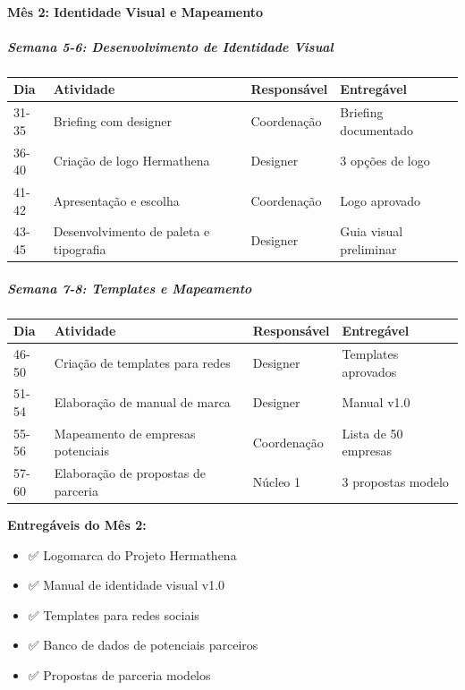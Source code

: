 \paragraph{Mês 2: Identidade Visual e Mapeamento}

\subparagraph{Semana 5-6: Desenvolvimento de Identidade Visual}

\bigskip\noindent
\begin{tabular}{p{}p{}p{}p{}}
\toprule
Dia & Atividade & Responsável & Entregável \\
\hline
31-35 & Briefing com designer & Coordenação & Briefing documentado \\
36-40 & Criação de logo Hermathena & Designer & 3 opções de logo \\
41-42 & Apresentação e escolha & Coordenação & Logo aprovado \\
43-45 & Desenvolvimento de paleta e tipografia & Designer & Guia visual preliminar \\
\bottomrule
\end{tabular}

\bigskip

\subparagraph{Semana 7-8: Templates e Mapeamento}

\bigskip\noindent
\begin{tabular}{p{}p{}p{}p{}}
\toprule
Dia & Atividade & Responsável & Entregável \\
\hline
46-50 & Criação de templates para redes & Designer & Templates aprovados \\
51-54 & Elaboração de manual de marca & Designer & Manual v1.0 \\
55-56 & Mapeamento de empresas potenciais & Coordenação & Lista de 50 empresas \\
57-60 & Elaboração de propostas de parceria & Núcleo 1 & 3 propostas modelo \\
\bottomrule
\end{tabular}

\bigskip

\textbf{Entregáveis do Mês 2:}

\begin{itemize}
\item ✅ Logomarca do Projeto Hermathena
\item ✅ Manual de identidade visual v1.0
\item ✅ Templates para redes sociais
\item ✅ Banco de dados de potenciais parceiros
\item ✅ Propostas de parceria modelos
\end{itemize}


